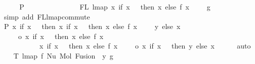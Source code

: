 \begin{isabellebody}
\ \ \isamarkupfalse%
\ \isamarkupfalse%
\ P{}{\isacharcolon}{\kern0pt}\ {\isachardoublequoteopen}{}\isanewline
\ \ \ \ \ \ \ \ \ \ \ \ \ {\isasymin}\ FL\ {\isacharparenleft}{\kern0pt}lmap\ {\isacharparenleft}{\kern0pt}{\isasymlambda}x{\isachardot}{\kern0pt}\ if\ x\ {\isacharequal}{\kern0pt}\ {}\ then\ x\ else\ f\ {\isacharparenleft}{\kern0pt}x\ {\isacharminus}{\kern0pt}\ {}{\isacharparenright}{\kern0pt}\ {\isacharplus}{\kern0pt}\ {}{\isacharparenright}{\kern0pt}\ g{\isacharparenright}{\kern0pt}{\isachardoublequoteclose}\isanewline
\ \ \ \ \isamarkupfalse%
\ {\isacharparenleft}{\kern0pt}simp\ add{\isacharcolon}{\kern0pt}\ FL{\isacharunderscore}{\kern0pt}lmap{\isacharunderscore}{\kern0pt}commute{\isacharparenright}{\kern0pt}\isanewline
\isanewline
\ \ \isamarkupfalse%
\ P{}{\isacharcolon}{\kern0pt}\ {\isachardoublequoteopen}{\isacharparenleft}{\kern0pt}{\isasymlambda}x{\isachardot}{\kern0pt}\ if\ x\ {\isacharequal}{\kern0pt}\ {}\ then\ {\isacharparenleft}{\kern0pt}{\isasymlambda}x{\isachardot}{\kern0pt}\ if\ x\ {\isacharequal}{\kern0pt}\ {}\ then\ x\ else\ f\ {\isacharparenleft}{\kern0pt}x\ {\isacharminus}{\kern0pt}\ {}{\isacharparenright}{\kern0pt}\ {\isacharplus}{\kern0pt}\ {}{\isacharparenright}{\kern0pt}\ y\ else\ x{\isacharparenright}{\kern0pt}\isanewline
\ \ \ \ \ o\ {\isacharparenleft}{\kern0pt}{\isasymlambda}x{\isachardot}{\kern0pt}\ if\ x\ {\isacharequal}{\kern0pt}\ {}\ then\ x\ else\ f\ {\isacharparenleft}{\kern0pt}x\ {\isacharminus}{\kern0pt}\ {}{\isacharparenright}{\kern0pt}\ {\isacharplus}{\kern0pt}\ {}{\isacharparenright}{\kern0pt}\ {\isacharequal}{\kern0pt}\isanewline
\ \ \ \ \ \ \ \ \ \ \ {\isacharparenleft}{\kern0pt}{\isasymlambda}x{\isachardot}{\kern0pt}\ if\ x\ {\isacharequal}{\kern0pt}\ {}\ then\ x\ else\ f\ {\isacharparenleft}{\kern0pt}x\ {\isacharminus}{\kern0pt}\ {}{\isacharparenright}{\kern0pt}\ {\isacharplus}{\kern0pt}\ {}{\isacharparenright}{\kern0pt}\ o\ {\isacharparenleft}{\kern0pt}{\isasymlambda}x{\isachardot}{\kern0pt}\ if\ x\ {\isacharequal}{\kern0pt}\ {}\ then\ y\ else\ x{\isacharparenright}{\kern0pt}{\isachardoublequoteclose}\isanewline
\ \ \ \ \isamarkupfalse%
\ auto\isanewline
\isanewline
\ \ \isamarkupfalse%
\ T{}{\isacharcolon}{\kern0pt}\ {\isachardoublequoteopen}lmap\ f\ {\isacharparenleft}{\kern0pt}Nu\ {\isacharparenleft}{\kern0pt}Mol\ {\isacharparenleft}{\kern0pt}Fusion\ {}\ y{\isacharparenright}{\kern0pt}\ g{\isacharparenright}{\kern0pt}{\isacharparenright}{\kern0pt}\ {\isacharequal}{\kern0pt}\isanewline

\end{isabellebody}
